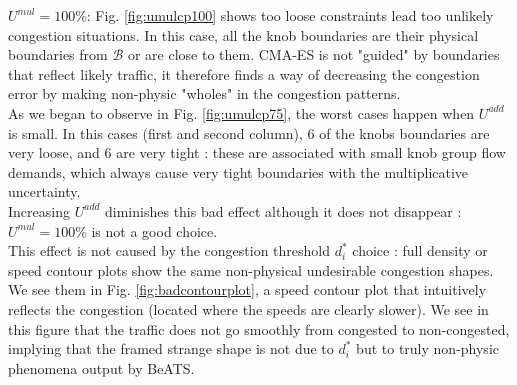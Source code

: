 \emph{$U^{mul}=100\% $}: Fig. \ref{fig:umulcp100} shows too loose constraints lead too unlikely congestion situations. In this case, all the knob boundaries are their physical boundaries from $\mathscr{B}$ or are close to them. CMA-ES is not "guided" by boundaries that reflect likely traffic, it therefore finds a way of decreasing the congestion error by making non-physic "wholes" in the congestion patterns.\\
As we began to observe in Fig. \ref{fig:umulcp75}, the worst cases happen when $U^{add}$ is small. In this cases (first and second column), $6$ of the knobs boundaries are very loose, and $6$ are very tight : these are associated with small knob group flow demands, which always cause very tight boundaries with the multiplicative uncertainty.\\
Increasing $U^{add}$ diminishes this bad effect although it does not disappear : $U^{mul}=100\% $ is not a good choice.\\
This effect is not caused by the congestion threshold $d_{i}^{*}$ choice : full density or speed contour plots show the same non-physical undesirable congestion shapes. We see them in Fig. \ref{fig:badcontourplot}, a speed contour plot that intuitively reflects the congestion (located where the speeds are clearly slower).
We see in this figure that the traffic does not go smoothly from congested to non-congested, implying that the framed strange shape is not due to $d_{i}^{*}$ but to truly non-physic phenomena output by BeATS.\\

